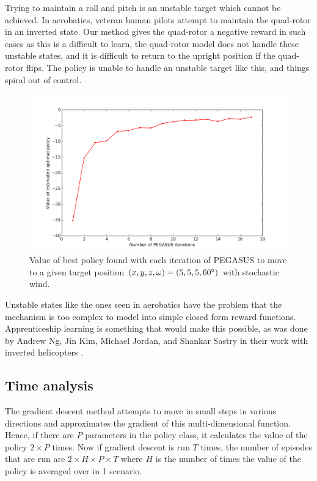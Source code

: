 \documentclass[hidelinks,BTech]{iitmdiss}
\begin{document}
Trying to maintain a roll and pitch is an unstable target which cannot be achieved. In aerobatics, veteran human pilots attempt to maintain the quad-rotor in an inverted state. Our method gives the quad-rotor a negative reward in such cases as this is a difficult to learn, the quad-rotor model does not handle these unstable states, and it is difficult to return to the upright position if the quad-rotor flips. The policy is unable to handle an unstable target like this, and things spiral out of control.

\begin{figure}[H]
  \centering
    \includegraphics[width=\textwidth]{quadrotor_position_control_time.png}
    \caption{Value of best policy found with each iteration of PEGASUS to move to a given target position $(x, y, z, \omega) = (5, 5, 5, 60\protect^{\circ})$ with stochastic wind.}
\end{figure}

Unstable states like the ones seen in aerobatics have the problem that the mechanism is too complex to model into simple closed form reward functions. Apprenticeship learning is something that would make this possible, as was done by Andrew Ng, Jin Kim, Michael Jordan, and Shankar Sastry in their work with inverted helicopters \cite{InvertedHelicopterFlight}.

\subsection{Time analysis}

The gradient descent method attempts to move in small steps in various directions and approximates the gradient of this multi-dimensional function. Hence, if there are $P$ parameters in the policy class, it calculates the value of the policy $2 \times P$ times. Now if gradient descent is run $T$ times, the number of episodes that are run are $2 \times H \times P \times T$ where $H$ is the number of times the value of the policy is averaged over in 1 scenario.
\end{document}
